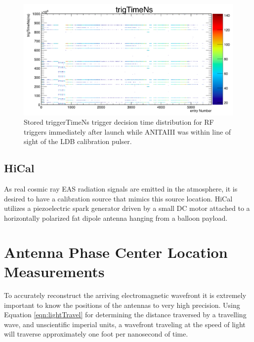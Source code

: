 	\begin{figure}
		\includegraphics[width=\textwidth]{figures/mcmTrigTimeNs}
		\caption{Stored triggerTimeNs trigger decision time distribution for RF triggers immediately after launch while ANITAIII was within line of sight of the LDB calibration pulser.}
		\label{fig:mcmTrigTimeNs}
	\end{figure}		

	
		
		
		
	\subsection{HiCal}
		As real cosmic ray EAS radiation signals are emitted in the atmosphere, it is desired to have a calibration source that mimics this source location.  HiCal utilizes a piezoelectric spark generator driven by a small DC motor attached to a horizontally polarized fat dipole antenna hanging from a balloon payload.


\section{Antenna Phase Center Location Measurements}
	To accurately reconstruct the arriving electromagnetic wavefront it is extremely important to know the positions of the antennas to very high precision.   Using Equation \ref{eqn:lightTravel} for determining the distance traversed by a travelling wave, and unscientific imperial units, a wavefront traveling at the speed of light will traverse approximately one foot per nanosecond of time. 
	
